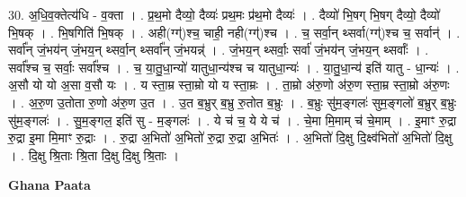 \documentclass[17pt]{extarticle}
\begin{document}
30. अ॒धि॒व॒क्तेत्य॑धि - व॒क्ता । . प्र॒थ॒मो दैव्यो॒ दैव्यः॑ प्रथ॒मः प्र॑थ॒मो दैव्यः॑ । . दैव्यो॑ भि॒षग् भि॒षग् दैव्यो॒ दैव्यो॑ भि॒षक् । . भि॒षगिति॑ भि॒षक् । . अही(ग्ग्॑)श्च॒ चाही॒ नही(ग्ग्॑)श्च । . च॒ सर्वा॒न् थ्सर्वा(ग्ग्॑)श्च च॒ सर्वान्॑ । . सर्वा᳚न् जं॒भय॑न् जं॒भय॒न् थ्सर्वा॒न् थ्सर्वा᳚न् जं॒भयन्न्॑ । . जं॒भय॒न् थ्सर्वाः॒ सर्वा॑ जं॒भय॑न् जं॒भय॒न् थ्सर्वाः᳚ । . सर्वा᳚श्च च॒ सर्वाः॒ सर्वा᳚श्च । . च॒ या॒तु॒धा॒न्यो॑ यातुधा॒न्य॑श्च च यातुधा॒न्यः॑ । . या॒तु॒धा॒न्य॑ इति॑ यातु - धा॒न्यः॑ । . अ॒सौ यो यो अ॒सा व॒सौ यः । . य स्ता॒म्र स्ता॒म्रो यो य स्ता॒म्रः । . ता॒म्रो अ॑रु॒णो अ॑रु॒ण स्ता॒म्र स्ता॒म्रो अ॑रु॒णः । . अ॒रु॒ण उ॒तोता रु॒णो अ॑रु॒ण उ॒त । . उ॒त ब॒भ्रुर् ब॒भ्रु रु॒तोत ब॒भ्रुः । . ब॒भ्रुः सु॑म॒ङ्गलः॑ सुम॒ङ्गलो॑ ब॒भ्रुर् ब॒भ्रुः सु॑म॒ङ्गलः॑ । . सु॒म॒ङ्गल॒ इति॑ सु - म॒ङ्गलः॑ । . ये च॑ च॒ ये ये च॑ । . चे॒मा मि॒माम् च॑ चे॒माम् । . इ॒माꣳ रु॒द्रा रु॒द्रा इ॒मा मि॒माꣳ रु॒द्राः । . रु॒द्रा अ॒भितो॑ अ॒भितो॑ रु॒द्रा रु॒द्रा अ॒भितः॑ । . अ॒भितो॑ दि॒क्षु दि॒क्ष्व॑भितो॑ अ॒भितो॑ दि॒क्षु । . दि॒क्षु श्रि॒ताः श्रि॒ता दि॒क्षु दि॒क्षु श्रि॒ताः । \newline

\textbf{Ghana Paata } \newline
\end{document}
